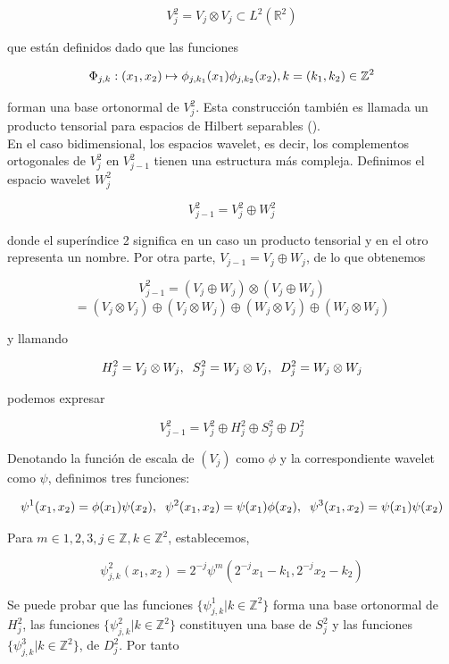 \begin{itemize}
$$V_j^2 = V_j \otimes V_j \subset L^2(\mathbb{R}^2)$$

que están definidos dado que las funciones

$$\Phi_{j,k}: (x_1,x_2) \mapsto \phi_{j,k_1}(x_1) \phi_{j,k_2}(x_2), \vspace{0.5cm} k= (k_1,k_2) \in \mathbb{Z}^2$$

forman una base ortonormal de $V_j^2$. Esta construcción también es llamada un producto tensorial para espacios de Hilbert separables (\cite{weid}). \\

En el caso bidimensional, los espacios wavelet, es decir, los complementos ortogonales de $V_j^2$ en $V_{j-1}^2$ tienen una estructura más compleja. Definimos el espacio wavelet $W_j^2$ 

$$V_{j-1}^2 = V_j^2 \oplus W_j^2$$

donde el superíndice 2 significa en un caso un producto tensorial y en el otro representa un nombre. Por otra parte, $V_{j-1} = V_j \oplus W_j$, de lo que obtenemos

$$V_{j-1}^2 = (V_j \oplus W_j) \otimes (V_j \oplus W_j)$$
$$ = (V_j \otimes V_j) \oplus (V_j \otimes W_j) \oplus (W_j \otimes V_j) \oplus (W_j \otimes W_j)$$

y llamando

$$H_j^2 = V_j \otimes W_j, \hspace{0.2cm} S_j^2 = W_j \otimes V_j, \hspace{0.2cm} D_j^2 = W_j \otimes W_j$$

podemos expresar

$$V_{j-1}^2 = V_j^2 \oplus H_j^2 \oplus S_j^2 \oplus D_j^2$$

Denotando la función de escala de $(V_j)$ como $\phi$ y la correspondiente wavelet como $\psi$, definimos tres funciones:

$$\psi^1(x_1,x_2) = \phi(x_1) \psi(x_2), \hspace{0.2cm} \psi^2(x_1,x_2) = \psi(x_1) \phi(x_2), \hspace{0.2cm} \psi^3(x_1,x_2) = \psi(x_1) \psi(x_2)$$

Para $m \in {1,2,3}, j \in \mathbb{Z}, k \in \mathbb{Z}^2$, establecemos,

$$\psi_{j,k}^2(x_1,x_2) = 2^{-j} \psi^m(2^{-j}x_1-k_1,2^{-j}x_2-k_2)$$

Se puede probar que las funciones $\{\psi_{j,k}^1 | k \in \mathbb{Z}^2 \}$ forma una base ortonormal de $H_j^2$, las funciones $\{\psi_{j,k}^2 | k \in \mathbb{Z}^2 \}$ constituyen una base de $S_j^2$ y las funciones $\{\psi_{j,k}^3 | k \in \mathbb{Z}^2 \}$, de $D_j^2$. Por tanto


\end{itemize}
